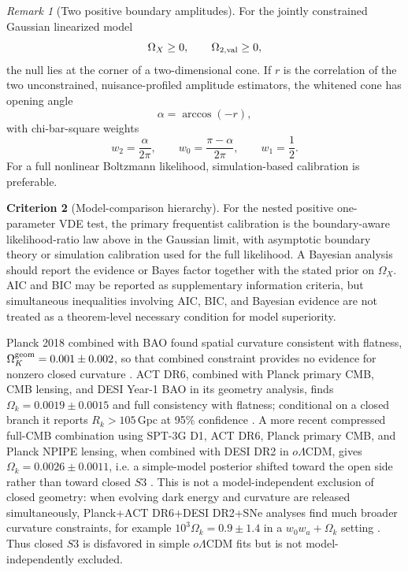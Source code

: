 \documentclass[11pt,a4paper]{article}
\def\Sthree{S3}%
\numberwithin{equation}{section}
\theoremstyle{definition}
\newtheorem{criterion}{Criterion}
\theoremstyle{plain}
\theoremstyle{remark}
\newtheorem{remark}[criterion]{Remark}
\newcommand{\Sthree}{S^3}
\begin{document}
\begin{remark}[Two positive boundary amplitudes]
For the jointly constrained Gaussian linearized model
\begin{equation}
\Omega_X\ge0,
\qquad
\Omega_{2,\rm val}\ge0,
\end{equation}
the null lies at the corner of a two-dimensional cone. If \(r\) is the correlation of the two unconstrained, nuisance-profiled amplitude estimators, the whitened cone has opening angle
\begin{equation}
\alpha=\arccos(-r),
\end{equation}
with chi-bar-square weights
\begin{equation}
w_2=\frac{\alpha}{2\pi},
\qquad
w_0=\frac{\pi-\alpha}{2\pi},
\qquad
w_1=\frac12.
\end{equation}
For a full nonlinear Boltzmann likelihood, simulation-based calibration is preferable.
\end{remark}

\begin{criterion}[Model-comparison hierarchy]
For the nested positive one-parameter VDE test, the primary frequentist calibration is the boundary-aware likelihood-ratio law above in the Gaussian limit, with asymptotic boundary theory or simulation calibration used for the full likelihood. A Bayesian analysis should report the evidence or Bayes factor together with the stated prior on \(\Omega_X\). AIC and BIC may be reported as supplementary information criteria, but simultaneous inequalities involving AIC, BIC, and Bayesian evidence are not treated as a theorem-level necessary condition for model superiority.
\end{criterion}

Planck 2018 combined with BAO found spatial curvature consistent with flatness, \(\Omega_K^{\rm geom}=0.001\pm0.002\), so that combined constraint provides no evidence for nonzero closed curvature \cite{Planck2018Parameters}. ACT DR6, combined with Planck primary CMB, CMB lensing, and DESI Year-1 BAO in its geometry analysis, finds \(\Omega_k=0.0019\pm0.0015\) and full consistency with flatness; conditional on a closed branch it reports \(R_k>105\,\mathrm{Gpc}\) at 95\% confidence \cite{ACTDR6Extended2025}. A more recent compressed full-CMB combination using SPT-3G D1, ACT DR6, Planck primary CMB, and Planck NPIPE lensing, when combined with DESI DR2 in \(o\Lambda\)CDM, gives \(\Omega_k=0.0026\pm0.0011\), i.e. a simple-model posterior shifted toward the open side rather than toward closed \(\Sthree\) \cite{CMBComp2026}. This is not a model-independent exclusion of closed geometry: when evolving dark energy and curvature are released simultaneously, Planck+ACT DR6+DESI DR2+SNe analyses find much broader curvature constraints, for example \(10^3\Omega_k=0.9\pm1.4\) in a \(w_0w_a+\Omega_k\) setting \cite{PulidoCervantes2026}. Thus closed \(\Sthree\) is disfavored in simple \(o\Lambda\)CDM fits but is not model-independently excluded.
\end{document}

